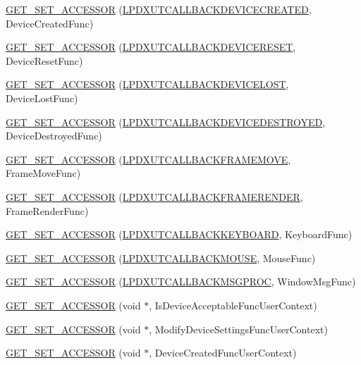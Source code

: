 \begin{DoxyCompactItemize}
\item 
\hyperlink{class_d_x_u_t_state_a28ff6aa907bdf2d644e716809d675e3d}{GET\_\-SET\_\-ACCESSOR} (\hyperlink{_d_x_u_t_8h_a359d98461cb8f9435379e46241716dc9}{LPDXUTCALLBACKDEVICECREATED}, DeviceCreatedFunc)
\item 
\hyperlink{class_d_x_u_t_state_a52f6283ad40d4aa454fff5e46bd78c4f}{GET\_\-SET\_\-ACCESSOR} (\hyperlink{_d_x_u_t_8h_a67752d19953202f34e9f4d8826ee611a}{LPDXUTCALLBACKDEVICERESET}, DeviceResetFunc)
\item 
\hyperlink{class_d_x_u_t_state_a16537d6c5610b75f7dab7ab240503993}{GET\_\-SET\_\-ACCESSOR} (\hyperlink{_d_x_u_t_8h_a38bc1228fe056e0cd5860f48ee6291df}{LPDXUTCALLBACKDEVICELOST}, DeviceLostFunc)
\item 
\hyperlink{class_d_x_u_t_state_ad201110513d5835fd72a77c9f150b2d9}{GET\_\-SET\_\-ACCESSOR} (\hyperlink{_d_x_u_t_8h_a1e80f441066b65558266d7a5770cbb6f}{LPDXUTCALLBACKDEVICEDESTROYED}, DeviceDestroyedFunc)
\item 
\hyperlink{class_d_x_u_t_state_aca288de0e62695d031688b1808b1895a}{GET\_\-SET\_\-ACCESSOR} (\hyperlink{_d_x_u_t_8h_a3eeca871425fb8ff60e4e76cbedebed4}{LPDXUTCALLBACKFRAMEMOVE}, FrameMoveFunc)
\item 
\hyperlink{class_d_x_u_t_state_afe19dfed1649c90abbef63930ea59013}{GET\_\-SET\_\-ACCESSOR} (\hyperlink{_d_x_u_t_8h_a16135d638bce122f8d286b028d027810}{LPDXUTCALLBACKFRAMERENDER}, FrameRenderFunc)
\item 
\hyperlink{class_d_x_u_t_state_a5c443318566115123606d590d7543e1f}{GET\_\-SET\_\-ACCESSOR} (\hyperlink{_d_x_u_t_8h_a194e486838161abf400b6c63ae43da9e}{LPDXUTCALLBACKKEYBOARD}, KeyboardFunc)
\item 
\hyperlink{class_d_x_u_t_state_a2b21b8cf08ca2fbcc1e73e471726e6a4}{GET\_\-SET\_\-ACCESSOR} (\hyperlink{_d_x_u_t_8h_a5aeb28f9c5f4d5cbd36381f30b92b51a}{LPDXUTCALLBACKMOUSE}, MouseFunc)
\item 
\hyperlink{class_d_x_u_t_state_ad1bb362f5ba107db996d96cd39bd8245}{GET\_\-SET\_\-ACCESSOR} (\hyperlink{_d_x_u_t_8h_a284dfd4bc64f5867e8198cd565bd4fc7}{LPDXUTCALLBACKMSGPROC}, WindowMsgFunc)
\item 
\hyperlink{class_d_x_u_t_state_a6b55445b52d42d0db602d6ad1d697f22}{GET\_\-SET\_\-ACCESSOR} (void $\ast$, IsDeviceAcceptableFuncUserContext)
\item 
\hyperlink{class_d_x_u_t_state_a5a076c00ff8b66a490d7dd6036df0e46}{GET\_\-SET\_\-ACCESSOR} (void $\ast$, ModifyDeviceSettingsFuncUserContext)
\item 
\hyperlink{class_d_x_u_t_state_a9eee36fb8df18717939c93fb0a9d5be6}{GET\_\-SET\_\-ACCESSOR} (void $\ast$, DeviceCreatedFuncUserContext)

\end{DoxyCompactItemize}
